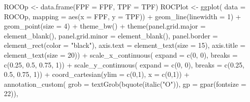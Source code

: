 \documentclass[
]{book}
\newenvironment{Shaded}{\begin{snugshade}}{\end{snugshade}}
\newcommand{\AttributeTok}[1]{\textcolor[rgb]{0.77,0.63,0.00}{#1}}
\newcommand{\DecValTok}[1]{\textcolor[rgb]{0.00,0.00,0.81}{#1}}
\newcommand{\FloatTok}[1]{\textcolor[rgb]{0.00,0.00,0.81}{#1}}
\newcommand{\FunctionTok}[1]{\textcolor[rgb]{0.00,0.00,0.00}{#1}}
\newcommand{\NormalTok}[1]{#1}
\newcommand{\OtherTok}[1]{\textcolor[rgb]{0.56,0.35,0.01}{#1}}
\newcommand{\SpecialCharTok}[1]{\textcolor[rgb]{0.00,0.00,0.00}{#1}}
\newcommand{\StringTok}[1]{\textcolor[rgb]{0.31,0.60,0.02}{#1}}
\begin{document}
\begin{Shaded}
\begin{Highlighting}[]
\NormalTok{ROCOp }\OtherTok{\textless{}{-}} \FunctionTok{data.frame}\NormalTok{(}\AttributeTok{FPF =}\NormalTok{ FPF, }\AttributeTok{TPF =}\NormalTok{ TPF)}
\NormalTok{ROCPlot }\OtherTok{\textless{}{-}} \FunctionTok{ggplot}\NormalTok{(}
  \AttributeTok{data =}\NormalTok{ ROCOp, }
  \AttributeTok{mapping =} \FunctionTok{aes}\NormalTok{(}\AttributeTok{x =}\NormalTok{ FPF, }\AttributeTok{y =}\NormalTok{ TPF)) }\SpecialCharTok{+} 
  \FunctionTok{geom\_line}\NormalTok{(}\AttributeTok{linewidth =} \DecValTok{1}\NormalTok{) }\SpecialCharTok{+} 
  \FunctionTok{geom\_point}\NormalTok{(}\AttributeTok{size =} \DecValTok{4}\NormalTok{) }\SpecialCharTok{+} 
  \FunctionTok{theme\_bw}\NormalTok{() }\SpecialCharTok{+} 
  \FunctionTok{theme}\NormalTok{(}\AttributeTok{panel.grid.major =} \FunctionTok{element\_blank}\NormalTok{(), }
        \AttributeTok{panel.grid.minor =} \FunctionTok{element\_blank}\NormalTok{(), }
        \AttributeTok{panel.border =} \FunctionTok{element\_rect}\NormalTok{(}\AttributeTok{color =} \StringTok{"black"}\NormalTok{), }
        \AttributeTok{axis.text =} \FunctionTok{element\_text}\NormalTok{(}\AttributeTok{size =} \DecValTok{15}\NormalTok{), }
        \AttributeTok{axis.title =} \FunctionTok{element\_text}\NormalTok{(}\AttributeTok{size =} \DecValTok{20}\NormalTok{)) }\SpecialCharTok{+}
  \FunctionTok{scale\_x\_continuous}\NormalTok{(}
    \AttributeTok{expand =} \FunctionTok{c}\NormalTok{(}\DecValTok{0}\NormalTok{, }\DecValTok{0}\NormalTok{), }
    \AttributeTok{breaks =} \FunctionTok{c}\NormalTok{(}\FloatTok{0.25}\NormalTok{, }\FloatTok{0.5}\NormalTok{, }\FloatTok{0.75}\NormalTok{, }\DecValTok{1}\NormalTok{)) }\SpecialCharTok{+} 
  \FunctionTok{scale\_y\_continuous}\NormalTok{(}
    \AttributeTok{expand =} \FunctionTok{c}\NormalTok{(}\DecValTok{0}\NormalTok{, }\DecValTok{0}\NormalTok{), }\AttributeTok{breaks =} \FunctionTok{c}\NormalTok{(}\FloatTok{0.25}\NormalTok{, }\FloatTok{0.5}\NormalTok{, }\FloatTok{0.75}\NormalTok{, }\DecValTok{1}\NormalTok{)) }\SpecialCharTok{+}
  \FunctionTok{coord\_cartesian}\NormalTok{(}\AttributeTok{ylim =} \FunctionTok{c}\NormalTok{(}\DecValTok{0}\NormalTok{,}\DecValTok{1}\NormalTok{), }\AttributeTok{x =} \FunctionTok{c}\NormalTok{(}\DecValTok{0}\NormalTok{,}\DecValTok{1}\NormalTok{)) }\SpecialCharTok{+} 
  \FunctionTok{annotation\_custom}\NormalTok{(}
    \AttributeTok{grob =} \FunctionTok{textGrob}\NormalTok{(}\FunctionTok{bquote}\NormalTok{(}\FunctionTok{italic}\NormalTok{(}\StringTok{"O"}\NormalTok{)),}
                    \AttributeTok{gp =} \FunctionTok{gpar}\NormalTok{(}\AttributeTok{fontsize =} \DecValTok{22}\NormalTok{)), }

\end{Highlighting}
\end{Shaded}
\end{document}
